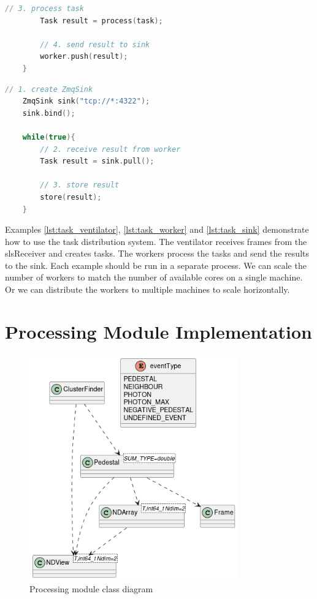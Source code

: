 \begin{spacing}{1.2}
\begin{lstlisting}[language=C++, caption=Example of a worker, label=lst:task_worker]
        // 3. process task
        Task result = process(task);

        // 4. send result to sink
        worker.push(result);
    }
\end{lstlisting}

    \begin{lstlisting}[language=C++, caption=Example of a sink, label=lst:task_sink]
    // 1. create ZmqSink
    ZmqSink sink("tcp://*:4322");
    sink.bind();

    while(true){
        // 2. receive result from worker
        Task result = sink.pull();

        // 3. store result
        store(result);
    }
\end{lstlisting}

    Examples \ref{lst:task_ventilator}, \ref{lst:task_worker} and \ref{lst:task_sink} demonstrate how to use the task distribution system.
    The ventilator receives frames from the slsReceiver and creates tasks. The workers process the tasks and send the results to the sink.
    Each example should be run in a separate process. We can scale the number of workers to match the number of available cores
    on a single machine. Or we can distribute the workers to multiple machines to scale horizontally.\\






    \section{Processing Module Implementation}
    \begin{figure}
        \centering
        \includegraphics[width=0.8\textwidth]{Chapitre3/figures/processing_class.png}
        \caption{Processing module class diagram}
        \label{fig:processing}
    \end{figure}


\end{spacing}
